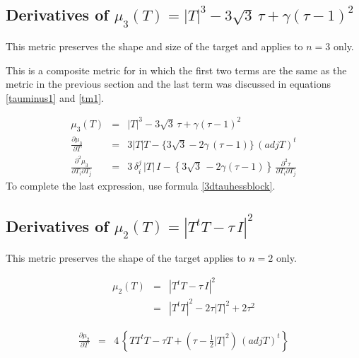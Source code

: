 \documentclass{report}
\begin{document}
\subsection{Derivatives of $\mu_3(T) = |T|^3 - 3 \sqrt{3} \, \tau + \gamma (\tau-1)^2$}

\noindent This metric preserves the shape and size of the target and applies
to $n=3$ only. \newline

\noindent This is a composite metric for in which the first two terms are the 
same as the metric in the previous section and the last term was discussed
in equations \ref{tauminus1} and \ref{tm1}. \newline 

\begin{eqnarray}
\mu_3 (T) & = & |T|^3 - 3 \sqrt{3} \, \tau + \gamma (\tau-1)^2 \\
\frac{\partial \mu_3}{\partial T} & = & 3 |T| T - \{ 3 \sqrt{3} - 2 \gamma \, (\tau-1) \}  \, (adj T)^t \\
\frac{\partial^2 \mu_3}{\partial T_i \partial T_j} & = & 3 \, \delta_i^j \, |T| \, I - \left\{ 3 \sqrt{3} \, - 2 \gamma (\tau-1) \right\} \, \frac{\partial^2 \tau}{\partial T_i \partial T_j}
\end{eqnarray}
To complete the last expression, use formula \ref{3dtauhessblock}. \newline

\subsection{Derivatives of $\mu_2(T)=|T^t T - \tau \, I|^2$}

This metric preserves the shape of the target applies to $n=2$ only. \newline

\begin{eqnarray}
\mu_2 (T) & = & |T^t T - \tau \, I|^2 \\
          & = & |T^t T|^2 - 2 \tau |T|^2 + 2 \tau^2 \nonumber
\end{eqnarray}

\begin{eqnarray}
\frac{\partial \mu_2}{\partial T} & = & 4 \, \left\{ T T^t T - \tau T + \left( \tau - \frac{1}{2} |T|^2 \right) \, (adj T)^t \right\}
\end{eqnarray}
\end{document}
